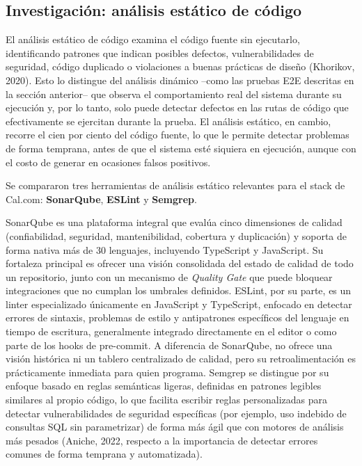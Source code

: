 \documentclass{article}
\begin{document}

\subsection{Investigación: análisis estático de código}

El análisis estático de código examina el código fuente sin
ejecutarlo, identificando patrones que indican posibles defectos,
vulnerabilidades de seguridad, código duplicado o violaciones a
buenas prácticas de diseño (Khorikov, 2020). Esto lo distingue del
análisis dinámico --como las pruebas E2E descritas en la sección
anterior-- que observa el comportamiento real del sistema durante su
ejecución y, por lo tanto, solo puede detectar defectos en las rutas
de código que efectivamente se ejercitan durante la prueba. El
análisis estático, en cambio, recorre el cien por ciento del código
fuente, lo que le permite detectar problemas de forma temprana, antes
de que el sistema esté siquiera en ejecución, aunque con el costo de
generar en ocasiones falsos positivos.

Se compararon tres herramientas de análisis estático relevantes para
el stack de Cal.com: \textbf{SonarQube}, \textbf{ESLint} y
\textbf{Semgrep}.

SonarQube es una plataforma integral que evalúa cinco dimensiones de
calidad (confiabilidad, seguridad, mantenibilidad, cobertura y
duplicación) y soporta de forma nativa más de 30 lenguajes,
incluyendo TypeScript y JavaScript. Su fortaleza principal es ofrecer
una visión consolidada del estado de calidad de todo un repositorio,
junto con un mecanismo de \emph{Quality Gate} que puede bloquear
integraciones que no cumplan los umbrales definidos.
ESLint, por su parte, es un linter especializado únicamente en
JavaScript y TypeScript, enfocado en detectar errores de sintaxis,
problemas de estilo y antipatrones específicos del lenguaje en
tiempo de escritura, generalmente integrado directamente en el editor
o como parte de los hooks de pre-commit. A diferencia de SonarQube,
no ofrece una visión histórica ni un tablero centralizado de
calidad, pero su retroalimentación es prácticamente inmediata para
quien programa.
Semgrep se distingue por su enfoque basado en reglas semánticas
ligeras, definidas en patrones legibles similares al propio código,
lo que facilita escribir reglas personalizadas para detectar
vulnerabilidades de seguridad específicas (por ejemplo, uso indebido
de consultas SQL sin parametrizar) de forma más ágil que con motores
de análisis más pesados (Aniche, 2022, respecto a la importancia de
detectar errores comunes de forma temprana y automatizada).
\end{document}
